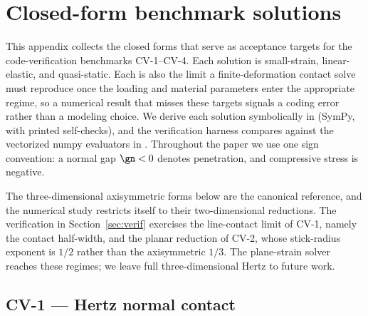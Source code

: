 \section{Closed-form benchmark solutions}\label{app:closedforms}

This appendix collects the closed forms that serve as acceptance targets for the
code-verification benchmarks CV-1--CV-4. Each solution is small-strain, linear-elastic,
and quasi-static. Each is also the limit a finite-deformation contact solve must reproduce
once the loading and material parameters enter the appropriate regime, so a numerical
result that misses these targets signals a coding error rather than a modeling choice. We
derive each solution symbolically in  (SymPy, with printed
self-checks), and the verification harness compares against the vectorized numpy evaluators
in . Throughout the paper we use one sign
convention: a normal gap $\gn<0$ denotes penetration, and compressive stress is negative.

The three-dimensional axisymmetric forms below are the canonical reference, and the
numerical study restricts itself to their two-dimensional reductions. The verification in
Section~\ref{sec:verif} exercises the line-contact limit of CV-1, namely the contact
half-width, and the planar reduction of CV-2, whose stick-radius exponent is $1/2$ rather
than the axisymmetric $1/3$. The plane-strain solver reaches these regimes; we leave full
three-dimensional Hertz to future work.

\subsection{CV-1 --- Hertz normal contact}\label{app:hertz}

